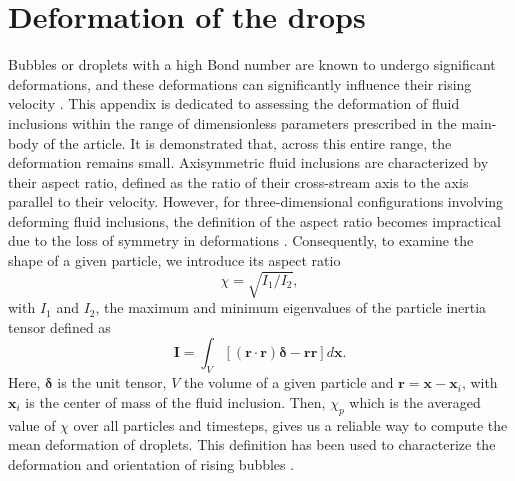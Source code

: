 \documentclass[11pt]{My_preprint}
\begin{document}
\appendix



\section{Deformation of the drops}
\label{ap:deformation} 

Bubbles or droplets with a high Bond number are known to undergo significant deformations, and these deformations can significantly influence their rising velocity \citep{bunner2003effect,tripathi2014}. 
This appendix is dedicated to assessing the deformation of fluid inclusions within the range of dimensionless parameters prescribed in the main-body of the article. 
It is demonstrated that, across this entire range, the deformation remains small. 
Axisymmetric fluid inclusions are characterized by their aspect ratio, defined as the ratio of their cross-stream axis to the axis parallel to their velocity. 
However, for three-dimensional configurations involving deforming fluid inclusions, the definition of the aspect ratio becomes impractical due to the loss of symmetry in deformations \citep{bunner2003effect}. 
Consequently, to examine the shape of a given particle, we introduce its aspect ratio  
\begin{equation}
    \chi =  \sqrt{I_1 /I_2},
\end{equation}
with $I_1$ and $I_2$, the maximum and minimum eigenvalues of the particle inertia tensor defined as
\begin{equation*}
    \textbf{I}
    = \int_{V} \left[
        (\textbf{r}\cdot \textbf{r}) \bm\delta  - \textbf{rr}
        \right]
    d\textbf{x}.
\end{equation*}
Here, $\bm\delta$ is the unit tensor, $V$ the volume of a given particle and $\textbf{r} = \textbf{x} - \textbf{x}_i$, with $\textbf{x}_i$ is the center of mass of the fluid inclusion. 
Then, $\chi_p$ which is the averaged value of $\chi$ over all particles and timesteps, gives us a reliable way to compute the mean deformation of droplets. 
This definition has been used to characterize the deformation and orientation of rising bubbles \citep{bunner2003effect}. 
\end{document}
